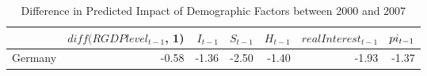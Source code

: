 \begin{table}[ht]
\centering
\begin{tabular}{rrrrrrr}
  \hline
 & $diff(RGDPlevel_{t-1}$, 1) & $I_{t-1}$ & $S_{t-1}$ & $H_{t-1}$ & $realInterest_{t-1}$ & $\\pi_{t-1}$ \\ 
  \hline
Germany & -0.58 & -1.36 & -2.50 & -1.40 & -1.93 & -1.37 \\ 
   \hline
\end{tabular}
\caption{Diﬀerence in Predicted Impact of Demographic Factors between 2000 and 2007} 
\end{table}

